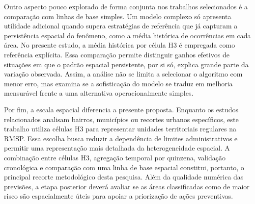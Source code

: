 \documentclass[12pt]{article}
\begin{document}
Outro aspecto pouco explorado de forma conjunta nos trabalhos selecionados é a comparação com linhas de base simples. Um modelo complexo só apresenta utilidade adicional quando supera estratégias de referência que já capturam a persistência espacial do fenômeno, como a média histórica de ocorrências em cada área. No presente estudo, a média histórica por célula H3 é empregada como referência explícita. Essa comparação permite distinguir ganhos efetivos de situações em que o padrão espacial persistente, por si só, explica grande parte da variação observada. Assim, a análise não se limita a selecionar o algoritmo com menor erro, mas examina se a sofisticação do modelo se traduz em melhoria mensurável frente a uma alternativa operacionalmente simples.

Por fim, a escala espacial diferencia a presente proposta. Enquanto os estudos relacionados analisam bairros, municípios ou recortes urbanos específicos, este trabalho utiliza células H3 para representar unidades territoriais regulares na RMSP. Essa escolha busca reduzir a dependência de limites administrativos e permitir uma representação mais detalhada da heterogeneidade espacial. A combinação entre células H3, agregação temporal por quinzena, validação cronológica e comparação com uma linha de base espacial constitui, portanto, o principal recorte metodológico desta pesquisa. Além da qualidade numérica das previsões, a etapa posterior deverá avaliar se as áreas classificadas como de maior risco são espacialmente úteis para apoiar a priorização de ações preventivas.
\end{document}

